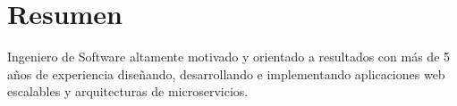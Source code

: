
\section{Resumen}
Ingeniero de Software altamente motivado y orientado a resultados con más de 5 años de experiencia diseñando, desarrollando e implementando aplicaciones web escalables y arquitecturas de microservicios.
